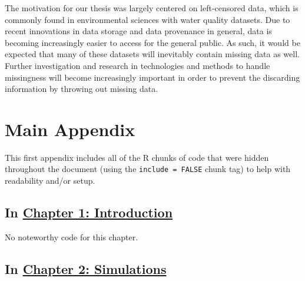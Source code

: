 \documentclass[12pt, twoside]{amherstthesis}
\begin{document}
The motivation for our thesis was largely centered on left-censored data, which is commonly found in environmental sciences with water quality datasets. Due to recent innovations in data storage and data provenance in general, data is becoming increasingly easier to access for the general public. As such, it would be expected that many of these datasets will inevitably contain missing data as well. Further investigation and research in technologies and methods to handle missingness will become increasingly important in order to prevent the discarding information by throwing out missing data.

\appendix

\hypertarget{main-appendix}{%
\chapter{Main Appendix}\label{main-appendix}}

This first appendix includes all of the R chunks of code that were hidden throughout the document (using the \texttt{include\ =\ FALSE} chunk tag) to help with readability and/or setup.

\hypertarget{in-chapter-1-introduction}{%
\section{\texorpdfstring{In \protect\hyperlink{intro}{Chapter 1: Introduction}}{In Chapter 1: Introduction}}\label{in-chapter-1-introduction}}

No noteworthy code for this chapter.

\hypertarget{in-chapter-2-simulations}{%
\section{\texorpdfstring{In \protect\hyperlink{simulations}{Chapter 2: Simulations}}{In Chapter 2: Simulations}}\label{in-chapter-2-simulations}}
\end{document}
